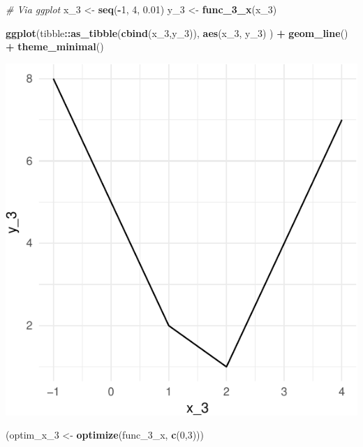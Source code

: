 \documentclass[11pt,]{article}
\newenvironment{Shaded}{\begin{snugshade}}{\end{snugshade}}
\newcommand{\KeywordTok}[1]{\textcolor[rgb]{0.13,0.29,0.53}{\textbf{#1}}}
\newcommand{\DecValTok}[1]{\textcolor[rgb]{0.00,0.00,0.81}{#1}}
\newcommand{\FloatTok}[1]{\textcolor[rgb]{0.00,0.00,0.81}{#1}}
\newcommand{\StringTok}[1]{\textcolor[rgb]{0.31,0.60,0.02}{#1}}
\newcommand{\CommentTok}[1]{\textcolor[rgb]{0.56,0.35,0.01}{\textit{#1}}}
\newcommand{\OperatorTok}[1]{\textcolor[rgb]{0.81,0.36,0.00}{\textbf{#1}}}
\newcommand{\NormalTok}[1]{#1}
\begin{document}
\begin{Shaded}
\begin{Highlighting}[]
\CommentTok{# Via ggplot}
\NormalTok{x_}\DecValTok{3}\NormalTok{ <-}\StringTok{ }\KeywordTok{seq}\NormalTok{(}\OperatorTok{-}\DecValTok{1}\NormalTok{, }\DecValTok{4}\NormalTok{, }\FloatTok{0.01}\NormalTok{)}
\NormalTok{y_}\DecValTok{3}\NormalTok{ <-}\StringTok{ }\KeywordTok{func_3_x}\NormalTok{(x_}\DecValTok{3}\NormalTok{)}

\KeywordTok{ggplot}\NormalTok{(tibble}\OperatorTok{::}\KeywordTok{as_tibble}\NormalTok{(}\KeywordTok{cbind}\NormalTok{(x_}\DecValTok{3}\NormalTok{,y_}\DecValTok{3}\NormalTok{)),}
       \KeywordTok{aes}\NormalTok{(x_}\DecValTok{3}\NormalTok{, y_}\DecValTok{3}\NormalTok{)}
\NormalTok{       ) }\OperatorTok{+}\StringTok{ }
\StringTok{  }\KeywordTok{geom_line}\NormalTok{() }\OperatorTok{+}
\StringTok{  }\KeywordTok{theme_minimal}\NormalTok{()}
\end{Highlighting}
\end{Shaded}

\includegraphics{Optimization_files/figure-latex/optimize_non_diff-2.pdf}

\begin{Shaded}
\begin{Highlighting}[]
\NormalTok{(optim_x_}\DecValTok{3}\NormalTok{ <-}\StringTok{ }\KeywordTok{optimize}\NormalTok{(func_3_x, }\KeywordTok{c}\NormalTok{(}\DecValTok{0}\NormalTok{,}\DecValTok{3}\NormalTok{)))}
\end{Highlighting}
\end{Shaded}
\end{document}
